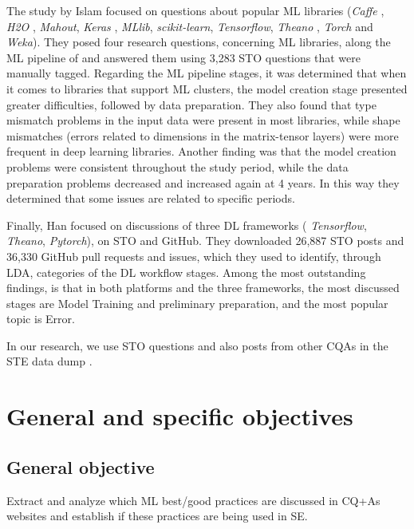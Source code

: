 \documentclass[conference]{IEEEtran}
\begin{document}
The study by Islam \etal focused on questions about popular \ac{ML} libraries (\ie \textit{Caffe} \cite{jia2014caffe},  \textit{H2O} \cite{H2OAutoML20},  \textit{Mahout}, \textit{Keras} \cite{Keras},  \textit{MLlib}, \textit{scikit-learn}\cite{scikit-learn}, \textit{Tensorflow}\cite{tensorflow2015},  \textit{Theano} \cite{theano}, \textit{Torch} \cite{torch} and \textit{Weka}\cite{weka}). They posed four research questions, concerning \ac{ML} libraries, along the \ac{ML} pipeline of \cite{ml_pipeline2017} and answered them using 3,283 \ac{STO} questions that were manually tagged. Regarding the \ac{ML} pipeline stages, it was determined that when it comes to libraries that support \ac{ML} clusters, the model creation stage presented greater difficulties, followed by data preparation. They also found that type mismatch problems in the input data were present in most libraries, while shape mismatches (errors related to dimensions in the matrix-tensor layers) were more frequent in deep learning libraries. Another finding was that the model creation problems were consistent throughout the study period, while the data preparation problems decreased and increased again at 4 years. In this way they determined that some issues are related to specific periods.

Finally, Han \etal \cite{Han_2020} focused on discussions of three \ac{DL} frameworks ( \ie  \textit{Tensorflow},  \textit{Theano},  \textit{Pytorch}), on \ac{STO} and GitHub. They downloaded 26,887 STO posts and 36,330 GitHub pull requests and issues, which they used to identify, through \ac{LDA}, categories of the \ac{DL} workflow stages. Among the most outstanding findings, is that in both platforms and the three frameworks, the most discussed stages are Model Training and preliminary preparation, and the most popular topic is Error.

In our research, we use \ac{STO} questions and  also  posts from other \acp{CQA} in the \ac{STE} data dump \cite{dump_STE_2021}.

\section{General and specific objectives}

\subsection{\textbf{General objective}}

Extract and analyze which \ac{ML} best/good practices are discussed in \acp{CQ+A} websites and establish if these practices are being used in \ac{SE}.
\end{document}
